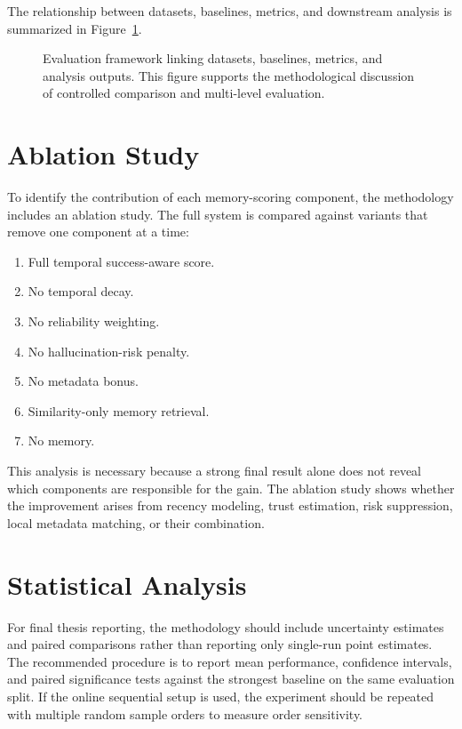 The relationship between datasets, baselines, metrics, and downstream analysis is summarized in Figure~\ref{fig:methodology-evaluation-framework}.

\begin{figure}[H]
    \centering
    
    \caption{Evaluation framework linking datasets, baselines, metrics, and analysis outputs. This figure supports the methodological discussion of controlled comparison and multi-level evaluation.}
    \label{fig:methodology-evaluation-framework}
\end{figure}

\section{Ablation Study}
\label{sec:methodology-ablation}

To identify the contribution of each memory-scoring component, the methodology includes an ablation study. The full system is compared against variants that remove one component at a time:

\begin{enumerate}[leftmargin=*]
\item Full temporal success-aware score.
\item No temporal decay.
\item No reliability weighting.
\item No hallucination-risk penalty.
\item No metadata bonus.
\item Similarity-only memory retrieval.
\item No memory.
\end{enumerate}

This analysis is necessary because a strong final result alone does not reveal which components are responsible for the gain. The ablation study shows whether the improvement arises from recency modeling, trust estimation, risk suppression, local metadata matching, or their combination.

\section{Statistical Analysis}
\label{sec:methodology-statistics}

For final thesis reporting, the methodology should include uncertainty estimates and paired comparisons rather than reporting only single-run point estimates. The recommended procedure is to report mean performance, confidence intervals, and paired significance tests against the strongest baseline on the same evaluation split. If the online sequential setup is used, the experiment should be repeated with multiple random sample orders to measure order sensitivity.

